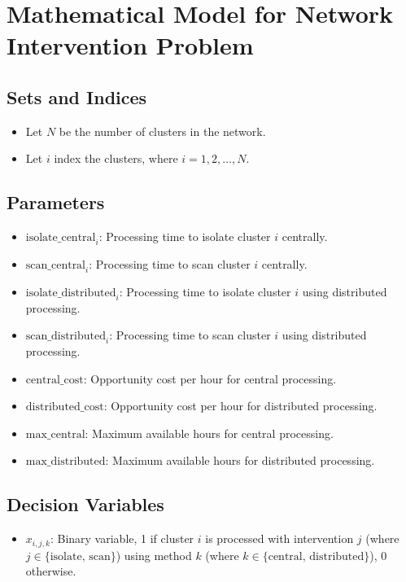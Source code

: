 \documentclass{article}
\begin{document}
\section*{Mathematical Model for Network Intervention Problem}

\subsection*{Sets and Indices}
\begin{itemize}
    \item Let \( N \) be the number of clusters in the network.
    \item Let \( i \) index the clusters, where \( i = 1, 2, \ldots, N \).
\end{itemize}

\subsection*{Parameters}
\begin{itemize}
    \item \( \text{isolate\_central}_i \): Processing time to isolate cluster \( i \) centrally.
    \item \( \text{scan\_central}_i \): Processing time to scan cluster \( i \) centrally.
    \item \( \text{isolate\_distributed}_i \): Processing time to isolate cluster \( i \) using distributed processing.
    \item \( \text{scan\_distributed}_i \): Processing time to scan cluster \( i \) using distributed processing.
    \item \( \text{central\_cost} \): Opportunity cost per hour for central processing.
    \item \( \text{distributed\_cost} \): Opportunity cost per hour for distributed processing.
    \item \( \text{max\_central} \): Maximum available hours for central processing.
    \item \( \text{max\_distributed} \): Maximum available hours for distributed processing.
\end{itemize}

\subsection*{Decision Variables}
\begin{itemize}
    \item \( x_{i,j,k} \): Binary variable, 1 if cluster \( i \) is processed with intervention \( j \) (where \( j \in \{\text{isolate, scan}\} \)) using method \( k \) (where \( k \in \{\text{central, distributed}\} \)), 0 otherwise.
\end{itemize}
\end{document}

